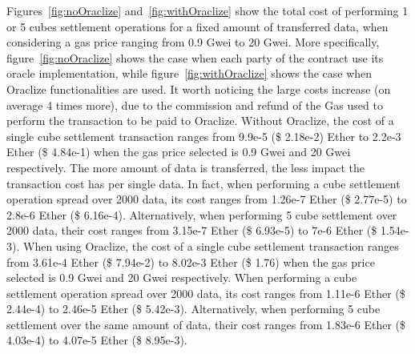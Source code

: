 Figures~\ref{fig:noOraclize} and~\ref{fig:withOraclize} show the total cost of performing 1 or 5 cubes settlement operations for a fixed amount of transferred data, when considering a gas price ranging from 0.9 Gwei to 20 Gwei.
More specifically, figure~\ref{fig:noOraclize} shows the case when each party of the contract use its oracle implementation, while figure~\ref{fig:withOraclize} shows the case when Oraclize functionalities are used. 
It worth noticing the large costs increase (on average 4 times more), due to the commission and refund of the Gas used to perform the transaction to be paid to Oraclize. 
Without Oraclize, the cost of a single cube settlement transaction ranges from 9.9e-5 (\$ 2.18e-2) Ether to 2.2e-3 Ether (\$ 4.84e-1) when the gas price selected is 0.9 Gwei and 20 Gwei respectively. The more amount of data is transferred, the less impact the transaction cost has per single data. In fact, when performing a cube settlement operation spread over 2000 data, its cost ranges from 1.26e-7 Ether (\$ 2.77e-5) to 2.8e-6 Ether (\$ 6.16e-4). Alternatively, when performing 5 cube settlement over 2000 data, their cost ranges from 3.15e-7 Ether (\$ 6.93e-5) to 7e-6 Ether (\$ 1.54e-3).
When using Oraclize, the cost of a single cube settlement transaction ranges from 3.61e-4 Ether (\$ 7.94e-2) to 8.02e-3 Ether (\$ 1.76) when the gas price selected is 0.9 Gwei and 20 Gwei respectively. When performing a cube settlement operation spread over 2000 data, its cost ranges from 1.11e-6 Ether (\$ 2.44e-4) to 2.46e-5 Ether (\$ 5.42e-3). Alternatively, when performing 5 cube settlement over the same amount of data, their cost ranges from 1.83e-6 Ether (\$ 4.03e-4) to 4.07e-5 Ether (\$ 8.95e-3).
\begin{table}[!htp]
	\centering
	\caption{Estimated data price for different use cases.}
	\label{tab:data_price}
\end{table}

